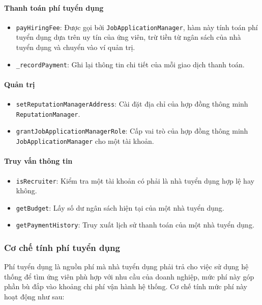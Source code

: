 \paragraph{Thanh toán phí tuyển dụng}

\begin{itemize}
  \item \texttt{payHiringFee}: Được gọi bởi \texttt{JobApplicationManager}, hàm này tính toán phí tuyển dụng dựa trên uy tín của ứng viên, trừ tiền từ ngân sách của nhà tuyển dụng và chuyển vào ví quản trị.
  \item \texttt{\_recordPayment}: Ghi lại thông tin chi tiết của mỗi giao dịch thanh toán.
\end{itemize}

\paragraph{Quản trị}

\begin{itemize}
  \item \texttt{setReputationManagerAddress}: Cài đặt địa chỉ của hợp đồng thông minh \texttt{ReputationManager}.
  \item \texttt{grantJobApplicationManagerRole}: Cấp vai trò của hợp đồng thông minh \texttt{JobApplicationManager} cho một tài khoản.
\end{itemize}

\paragraph{Truy vấn thông tin}

\begin{itemize}
  \item \texttt{isRecruiter}: Kiểm tra một tài khoản có phải là nhà tuyển dụng hợp lệ hay không.
  \item \texttt{getBudget}: Lấy số dư ngân sách hiện tại của một nhà tuyển dụng.
  \item \texttt{getPaymentHistory}: Truy xuất lịch sử thanh toán của một nhà tuyển dụng.
\end{itemize}

\subsubsection{Cơ chế tính phí tuyển dụng}

Phí tuyển dụng là nguồn phí mà nhà tuyển dụng phải trả cho việc sử dụng hệ thống để tìm ứng viên phù hợp với nhu cầu của doanh nghiệp, mức phí này góp phần bù đắp vào khoảng chi phí vận hành hệ thống. Cơ chế tính mức phí này hoạt động như sau:

